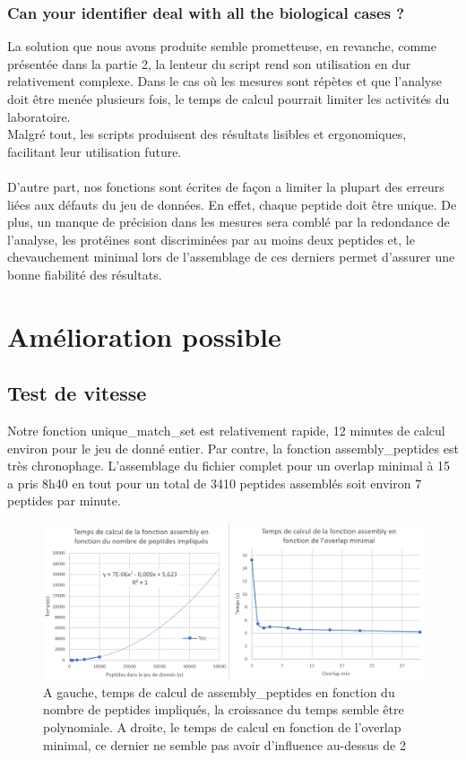 \documentclass[titlepage]{report}
\begin{document}
\subsubsection{Can your identifier deal with all the biological cases ?}
\hspace*{1cm}La solution que nous avons produite semble prometteuse, en revanche, comme présentée dans la partie 2, la lenteur du script rend son utilisation en dur relativement complexe. Dans le cas où les mesures sont répètes et que l'analyse doit être menée plusieurs fois, le temps de calcul pourrait limiter les activités du laboratoire. \\
Malgré tout, les scripts produisent des résultats lisibles et ergonomiques, facilitant leur utilisation future. \\
\\
\hspace*{1cm} D'autre part, nos fonctions sont écrites de façon a limiter la plupart des erreurs liées aux défauts du jeu de données. En effet, chaque peptide doit être unique. De plus, un manque de précision dans les mesures sera comblé par la redondance de l'analyse, les protéines sont discriminées par au moins deux peptides et, le chevauchement minimal lors de l'assemblage de ces derniers permet d'assurer une bonne fiabilité des résultats.  


\section{Amélioration possible}
\subsection{Test de vitesse}
\hspace*{1cm}Notre fonction unique\_match\_set est relativement rapide, 12 minutes de calcul environ pour le jeu de donné entier. Par contre, la fonction assembly\_peptides est très chronophage. L'assemblage du fichier complet pour un overlap minimal à 15 a pris 8h40 en tout pour un total de 3410 peptides assemblés soit environ 7 peptides par minute. 
\begin{figure}[H]\centerline{\includegraphics[width=1\textwidth]{overlap.png}}\captionsetup{justification=centering}
\caption{A gauche, temps de calcul de assembly\_peptides en fonction du nombre de peptides impliqués, la croissance du temps semble être polynomiale. A droite, le temps de calcul en fonction de l'overlap minimal, ce dernier ne semble pas avoir d'influence au-dessus de 2 }\end{figure}
\end{document}
